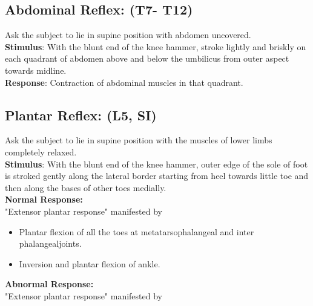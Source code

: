 \documentclass[a4paper,12pt]{book}
\begin{document}
\subsection*{Abdominal Reflex: (T7- T12)}
Ask the subject to lie in supine position with abdomen uncovered.\\
\textbf{Stimulus}: With the blunt end of the knee hammer, stroke lightly and briskly on each quadrant of abdomen above and below the umbilicus from outer aspect towards midline.\\
\textbf{Response}: Contraction of abdominal muscles in that quadrant.
\subsection*{Plantar Reflex: (L5, SI)}
Ask the subject to lie in supine position with the muscles of lower limbs completely relaxed.\\
\textbf{Stimulus}: With the blunt end of the knee hammer, outer edge of the sole of foot is stroked gently along the lateral border starting from heel towards little toe and then along the bases of other toes medially.\\
\textbf{Normal Response: }\\
"Extensor plantar response" manifested by
\begin{itemize}
\item{Plantar flexion of all the toes at metatarsophalangeal and inter phalangealjoints.}
\item{Inversion and plantar flexion of ankle.}
\end{itemize}
\textbf{Abnormal Response:}\\
"Extensor plantar response" manifested by
\end{document}

